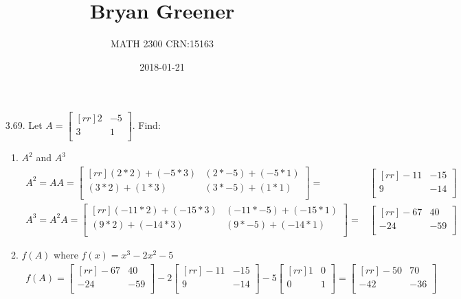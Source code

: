 \documentclass[12pt]{article}
\title{Bryan Greener}
\author{MATH 2300 CRN:15163}
\date{2018-01-21}
\begin{document}
\maketitle

\TabPositions{4cm}


\begin{enumerate}
\item [3.69.] Let $A= \begin{bmatrix}[rr] 2 & -5\\ 3 & 1\\ \end{bmatrix}$. Find:
	\begin{enumerate}
	\item $A^2$ and $A^3$\\
	\begin{align*}
	 	A^2 = AA = 
		\begin{bmatrix}[rr]
		(2*2)+(-5*3) & (2*-5)+(-5*1)\\
		(3*2)+(1*3) & (3*-5)+(1*1)\\
		\end{bmatrix}
		=
		&\begin{bmatrix}[rr] -11 & -15\\ 9 & -14\\ \end{bmatrix}\\
		A^3 = A^2A =
		\begin{bmatrix}[rr]
		(-11*2)+(-15*3) & (-11*-5)+(-15*1)\\
		(9*2)+(-14*3) & (9*-5)+(-14*1)\\
		\end{bmatrix}
		=
		&\begin{bmatrix}[rr] -67 & 40\\ -24 & -59\\ \end{bmatrix}
	\end{align*}
	
	\item $f(A)$ where $f(x)=x^3-2x^2-5$
	\begin{align*}
		f(A) =
		\begin{bmatrix}[rr] -67 & 40\\ -24 & -59\\ \end{bmatrix}
		-2 \begin{bmatrix}[rr] -11 & -15\\ 9 & -14\\ \end{bmatrix}
		-5 \begin{bmatrix}[rr] 1 & 0\\ 0 & 1\\ \end{bmatrix}
		= \begin{bmatrix}[rr] -50 & 70\\ -42 & -36\\ \end{bmatrix}
	\end{align*}
	

\end{enumerate}
\end{enumerate}
\end{document}

